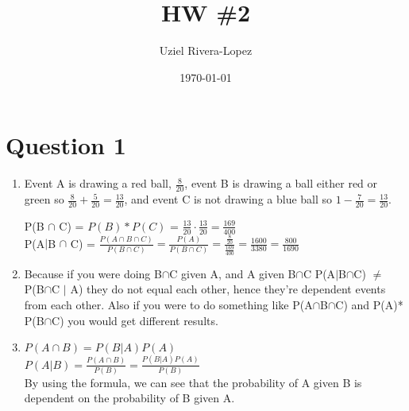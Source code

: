 \documentclass{article}
\title{HW \#2}
\author{
    Uziel Rivera-Lopez
}
\date{\today}
\begin{document}
\maketitle

\section*{Question 1}
\begin{enumerate}[label=\alph*)]
    \item  Event A is drawing a red ball, $\frac{8}{20}$, event B is drawing a ball either red or green so $\frac{8}{20} + \frac{5}{20} = \frac{13}{20}$, and event C
    is not drawing a blue ball so $1-\frac{7}{20}=\frac{13}{20}$.

    P(B $\cap$ C) = $P(B)*P(C)$ = $\frac{13}{20} \cdot \frac{13}{20} = \frac{169}{400}$
    \\P(A$|$B $\cap$ C) = $\frac{P(A \cap B \cap C)}{P(B \cap C)} = \frac{P(A)}{P(B \cap C)} = \frac{\frac{8}{20}}{\frac{169}{400}} = \frac{1600}{3380} = \frac{800}{1690}$

    \item Because if you were doing B$\cap$C given A, and A given B$\cap$C
    P(A$|$B$\cap$C) $\neq$ P(B$\cap$C $|$ A) 
    they do not equal each other, hence they're dependent events from each other. Also if you were to do something like P(A$\cap$B$\cap$C) and P(A)* P(B$\cap$C) you would get different results.

    \item $P(A \cap B) = P(B|A)P(A)$
    \\$P(A | B) = \frac{P(A \cap B)}{P(B)} = \frac{P(B|A) P(A)}{P(B)}$
    \\ By using the formula, we can see that the probability of A given B is dependent on the probability of B given A.
\end{enumerate}
\end{document}
